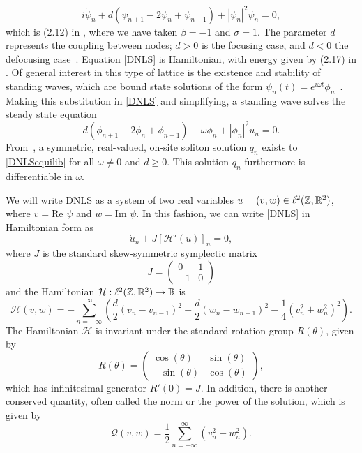 \documentclass[thesis.tex]{subfiles}
\begin{document}
\begin{equation}\label{DNLS}
i\dot{\psi}_n + d(\psi_{n+1} - 2 \psi_n + \psi_{n-1}) + |\psi_n|^2 \psi_n = 0,
\end{equation}
which is (2.12) in \cite{Kevrekidis2009}, where we have taken $\beta = -1$ and $\sigma = 1$. The parameter $d$ represents the coupling between nodes; $d > 0$ is the focusing case, and $d < 0$ the defocusing case~\cite{Kevrekidis2009}. Equation \cref{DNLS} is Hamiltonian, with energy given by (2.17) in \cite{Kevrekidis2009,pelinovsky_2011}. Of general interest in this type of lattice is the existence and stability of standing waves, which are bound state solutions of the form $\psi_n(t) = e^{i \omega t}\phi_n$~\cite{alfimov}. Making this substitution in \cref{DNLS} and simplifying, a standing wave solves the steady state equation
\begin{equation}\label{DNLSequilib}
d(\phi_{n+1} - 2 \phi_n + \phi_{n-1}) - \omega \phi_n + |\phi_n|^2 u_n = 0.
\end{equation}
From~\cite{herrmann_2011}, a symmetric, real-valued, on-site soliton solution $q_n$ exists to \cref{DNLSequilib} for all $\omega \neq 0$ and $d \geq 0$. This solution $q_n$ furthermore is differentiable in $\omega$. 

We will write DNLS as a system of two real variables $u = (v, w) \in \ell^2(\mathbb{Z}, \mathbb{R}^2)$, where $v = \text{Re }\psi$ and $w = \text{Im }\psi$. In this fashion, we can write \cref{DNLS} in Hamiltonian form as
\begin{equation}\label{DNLSrealHam}
\dot{u}_n + J [\mathcal{H}'(u)]_n = 0,
\end{equation}
where $J$ is the standard skew-symmetric symplectic matrix
\[
J = \begin{pmatrix}0 & 1 \\ -1 & 0\end{pmatrix}
\]
and the Hamiltonian $\mathcal{H}: \ell^2(\mathbb{Z},\mathbb{R}^2) \rightarrow \mathbb{R}$ is
\begin{equation}\label{DNLSrealH}
\mathcal{H}(v, w) = -\sum_{n = -\infty}^\infty 
\left( \frac{d}{2}\left(v_n - v_{n-1}\right)^2 + \frac{d}{2}\left(w_n - w_{n-1}\right)^2 - \frac{1}{4}\left( v_n^2 + w_n^2 \right)^2 \right).
\end{equation}
The Hamiltonian $\mathcal{H}$ is invariant under the standard rotation group $R(\theta)$, given by
\begin{equation}\label{Rtheta}
R(\theta) = \begin{pmatrix}
\cos(\theta) & \sin(\theta) \\
-\sin(\theta)& \cos(\theta)
\end{pmatrix},
\end{equation}
which has infinitesimal generator $R'(0) = J$. In addition, there is another conserved quantity, often called the norm or the power of the solution, which is given by
\begin{equation}\label{DNLSQ}
\mathcal{Q}(v, w) = \frac{1}{2} \sum_{n = -\infty}^\infty 
\left( v_n^2 + w_n ^2\right).
\end{equation}
\end{document}
